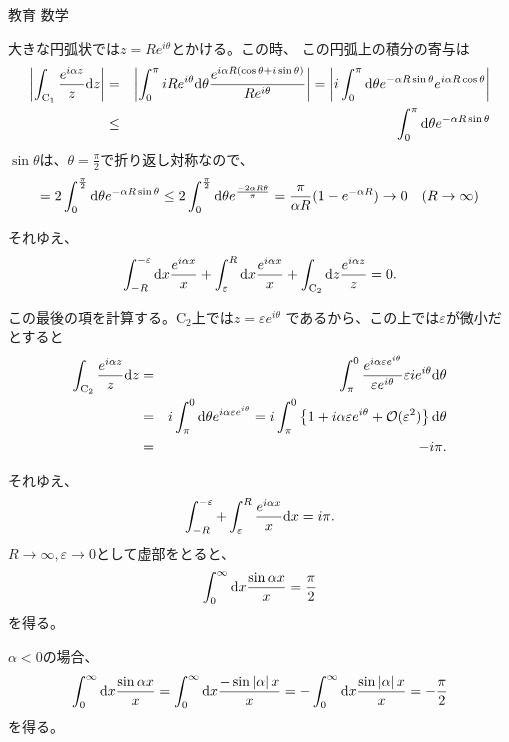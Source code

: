 \documentclass[fleqn]{jbook}
\begin{document}
\begin{answer}{教育 数学}{}
\begin{subanswers}
\begin{subsubanswers}
大きな円弧状では$ z= R e^{i \theta}$とかける。この時、
この円弧上の積分の寄与は
\begin{eqnarray*}
\left| \int_{\text{C}_1} \frac{e^{i \alpha z}}{z} {\rm d}z \right|&=&
\left| \int_{0}^{\pi} i R e^{i \theta} {\rm d}\theta \frac{e^{i \alpha R 
(\cos \theta + i \sin \theta)}}{ R e^{i \theta}} \right|
= \left|i \int_{0}^{\pi} {\rm d}\theta e^{-\alpha R \sin \theta} 
e^{i \alpha R \cos \theta} \right| \\
&\leq&  \int_{0}^{\pi} {\rm d}\theta e^{-\alpha R \sin \theta} 
\end{eqnarray*}
$\sin \theta$は、$\theta = \frac{\pi}{2}$で折り返し対称なので、
\begin{eqnarray*}
=2 \int_{0}^{\frac{\pi}{2}} {\rm d}\theta e^{-\alpha R \sin \theta} 
\leq 2 \int_{0}^{\frac{\pi}{2}} {\rm d}\theta e^{\frac{-2\alpha R \theta}{\pi}} 
=\frac{\pi}{\alpha R} (1-e^{-\alpha R}) \rightarrow 0
 \quad (R \rightarrow \infty)
\end{eqnarray*}

それゆえ、
\[ \int_{-R}^{-\varepsilon} {\rm d}x \frac{e^{i \alpha x}}{x}
+ \int_{\varepsilon}^{R} {\rm d}x \frac{e^{i \alpha x}}{x} 
+ \int_{\text{C}_2} {\rm d}z \frac{e^{i \alpha z}}{z} = 0.\]

この最後の項を計算する。$\mbox{C}_2$上では$z=\varepsilon e^{i \theta}$
であるから、この上では$\varepsilon$が微小だとすると
\begin{eqnarray*}
\int_{\text{C}_2} \frac{e^{i \alpha z}}{z} {\rm d}z &=& \int_{\pi}^{0}
\frac{e^{i \alpha \varepsilon e^{i \theta}}}{\varepsilon e^{i \theta}}
\varepsilon i e^{i \theta} {\rm d}\theta \\
&=& i \int_{\pi}^{0} {\rm d}\theta e^{i \alpha \varepsilon e^{i \theta}}
= i \int_{\pi}^{0} \left\{ 1 + i \alpha \varepsilon e^{i \theta}
+ {\cal{O}}(\varepsilon^2) \right\} {\rm d}\theta \\
&=& - i\pi.
\end{eqnarray*}

それゆえ、
\[ \int_{-R}^{-\varepsilon} + \int_{\varepsilon}^{R} \frac{e^{i\alpha x}}{x}
{\rm d}x = i \pi.\]
$R \rightarrow \infty, \varepsilon \rightarrow 0$として虚部をとると、
\[ \int_{0}^{\infty} {\rm d}x \frac{\sin \alpha x}{x} = \frac{\pi}{2}\]
を得る。

$\alpha <0$の場合、
\[ \int_{0}^{\infty} {\rm d}x \frac{\sin \alpha x}{x} = 
\int_{0}^{\infty} {\rm d}x \frac{-\sin \left| \alpha \right|x}{x} =
-\int_{0}^{\infty} {\rm d}x \frac{\sin \left| \alpha \right|x}{x} =
-\frac{\pi}{2}\]
を得る。

\SubSubAnswer


\end{subsubanswers}
\end{subanswers}
\end{answer}
\end{document}
